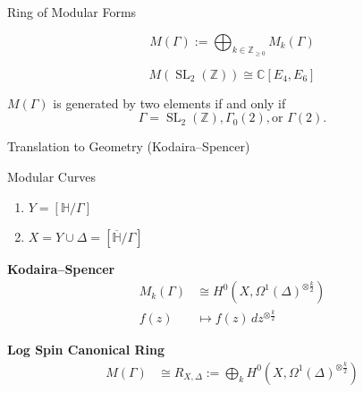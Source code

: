 \documentclass{beamer}
\theoremstyle{remark}
\newcommand\BH{{\mathbb H}}
\newcommand\BC{{\mathbb C}}
\newcommand\BZ{{\mathbb Z}}
\newcommand{\SL}{\operatorname{SL}}
\begin{document}

\begin{frame}{Ring of Modular Forms}

\begin{definition}
\[
	M(\Gamma) := \bigoplus_{k \in \BZ_{\geq 0}} M_k(\Gamma)
\]
\end{definition}

\pause
\begin{example}
\[
	M(\SL_2(\BZ)) \cong \BC[E_4,E_6]
\]
\end{example}

\pause
\begin{theorem}[Wagreich]
$M(\Gamma)$ is generated by two elements if and only if 
\[
	\Gamma = \SL_2(\BZ), \Gamma_0(2), \text{or } \Gamma(2).
\]

\end{theorem}
\end{frame}


\begin{frame}{Translation to Geometry (Kodaira--Spencer)}
\begin{block}{Modular Curves}
\begin{enumerate}
  \item $Y = [\BH / \Gamma]$
  \item $X = Y \cup \Delta = [\overline{\BH} / \Gamma]$
\end{enumerate}
\end{block}

\pause
\begin{block}{\textbf{Kodaira--Spencer}}
\begin{align*}
  M_k(\Gamma) &\cong H^0(X, \Omega^1(\Delta)^{\otimes \frac{k}{2}}) \\
	f(z) &\mapsto f(z)\, dz^{\otimes \frac{k}{2}}
\end{align*}
\end{block}

\pause
\begin{block}{\textbf{Log Spin Canonical Ring}}
\begin{align*}
  M(\Gamma) &\cong R_{X,\Delta} := \bigoplus_k H^0(X, \Omega^1(\Delta)^{\otimes \frac{k}{2}}) \\
\end{align*}
\end{block}

\end{frame}

\end{document}
